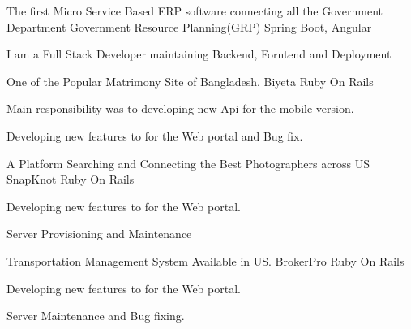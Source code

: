 

\begin{cventries}
	
	\cventry
	{The first Micro Service Based ERP software connecting all the Government Department} %
	{Government Resource Planning(GRP)}
	{Spring Boot, Angular}
	{}
	{	\begin{cvitems} %
    \item I am a Full Stack Developer maintaining Backend, Forntend and Deployment
	\end{cvitems}
	}
	
	\cventry
	{One of the Popular Matrimony Site of Bangladesh.} %
	{Biyeta}
	{Ruby On Rails}
	{}
	{	\begin{cvitems} %
    \item Main responsibility was to developing new Api for the mobile version. 
	\item Developing new features to for the Web portal and Bug fix.
		\end{cvitems}
	}
	
	\cventry
	{A Platform Searching and Connecting the Best Photographers across US} %
	{SnapKnot}
	{Ruby On Rails}
	{}
	{	\begin{cvitems} %
  	\item Developing new features to for the Web portal.
	\item Server Provisioning and Maintenance
		\end{cvitems}
	}
	\cventry
	{Transportation Management System Available in US.} %
	{BrokerPro}
	{Ruby On Rails}
	{}
	{	\begin{cvitems} %
			\item Developing new features to for the Web portal.
			\item Server Maintenance and Bug fixing.
		\end{cvitems}
	}
\end{cventries}
